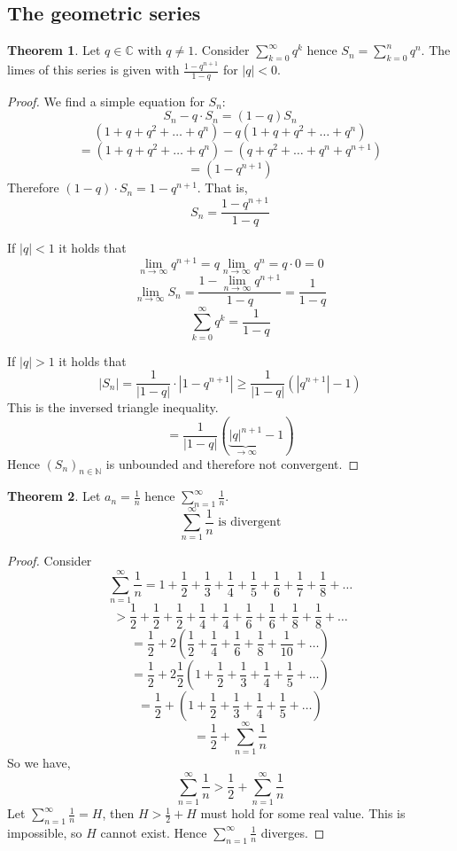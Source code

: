 \documentclass[a4paper,landscape,twocolumn]{article}
\theoremstyle{definition}
\newtheorem{theorem}{Theorem}
\newcommand\abs[1]{\left|#1\right|}
\newcommand\seq[1]{{\left(#1\right)}_{n \in \mathbb N}}
\begin{document}
\subsection{The geometric series}
\begin{theorem}
  Let $q \in \mathbb C$ with $q \neq 1$.
  Consider $\sum_{k=0}^\infty q^k$ hence $S_n = \sum_{k=0}^{n} q^n$.
  The limes of this series is given with $\frac{1 - q^{n+1}}{1 - q}$ for $\abs{q} < 0$.
\end{theorem}
\begin{proof}
  We find a simple equation for $S_n$:
  \[ S_n - q \cdot S_n = (1 - q) S_n \]
  \[ (1 + q + q^2 + \dots + q^n) - q (1 + q + q^2 + \dots + q^n) \]
  \[ = (1 + q + q^2 + \dots + q^n) - (q + q^2 + \dots + q^n + q^{n+1}) \]
  \[ = (1 - q^{n+1}) \]
  Therefore $(1 - q) \cdot S_n = 1 - q^{n+1}$. That is,
  \[ S_n = \frac{1 - q^{n+1}}{1 - q} \]

  If $\abs{q} < 1$ it holds that
  \[ \lim_{n\to\infty} q^{n+1} = q \lim_{n\to\infty} q^n = q \cdot 0 = 0 \]
  \[ \lim_{n\to\infty} S_n = \frac{1 - \lim_{n\to\infty} q^{n+1}}{1 - q} = \frac{1}{1 - q} \]
  \[ \sum_{k=0}^\infty q^k = \frac{1}{1 - q} \]

  If $\abs{q} > 1$ it holds that
  \[
    \abs{S_n}
    = \frac{1}{\abs{1 - q}} \cdot \abs{1 - q^{n+1}}
    \geq \frac{1}{\abs{1 - q}} \left(\abs{q^{n+1}} - 1\right)
  \]
  This is the inversed triangle inequality.
  \[ = \frac{1}{\abs{1 - q}} \left(\underbrace{\abs{q}^{n+1}}_{\to\infty} - 1\right) \]
  Hence $\seq{S_n}$ is unbounded and therefore not convergent.
\end{proof}

\begin{theorem}
  Let $a_n = \frac1n$ hence $\sum_{n=1}^\infty \frac1n$.
  \[ \sum_{n=1}^\infty \frac1n \text{ is divergent} \]
\end{theorem}
\begin{proof}
  Consider
  \[ \sum_{n=1}^\infty \frac1n = 1 + \frac12 + \frac13 + \frac14 + \frac15 + \frac16 + \frac17 + \frac18 + \dots \]
  \[ > \frac12 + \frac12 + \frac12 + \frac14 + \frac14 + \frac16 + \frac16 + \frac18 + \frac18 + \dots \]
  \[ = \frac12 + 2 \left(\frac12 + \frac14 + \frac16 + \frac18 + \frac1{10} + \dots\right) \]
  \[ = \frac12 + 2 \frac12 \left(1 + \frac12 + \frac13 + \frac14 + \frac15 + \dots\right) \]
  \[ = \frac12 + \left(1 + \frac12 + \frac13 + \frac14 + \frac15 + \dots\right) \]
  \[ = \frac12 + \sum_{n=1}^\infty \frac1n \]
  So we have,
  \[ \sum_{n=1}^\infty \frac1n > \frac12 + \sum_{n=1}^\infty \frac1n \]
  Let $\sum_{n=1}^\infty \frac1n = H$, then $H > \frac12 + H$ must hold for some real value.
  This is impossible, so $H$ cannot exist. Hence $\sum_{n=1}^\infty \frac1n$ diverges.
\end{proof}
\end{document}
